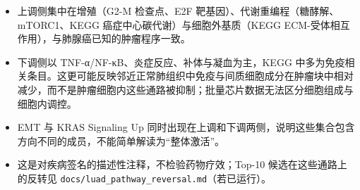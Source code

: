 \documentclass[
  10pt,
]{ctexart}
\providecommand{\tightlist}{%
  \setlength{\itemsep}{0pt}\setlength{\parskip}{0pt}}
\begin{document}
\begin{itemize}
\tightlist
\item
  上调侧集中在增殖（G2-M 检查点、E2F
  靶基因）、代谢重编程（糖酵解、mTORC1、KEGG
  癌症中心碳代谢）与细胞外基质（KEGG
  ECM-受体相互作用），与肺腺癌已知的肿瘤程序一致。
\item
  下调侧以 TNF-α/NF-κB、炎症反应、补体与凝血为主，KEGG
  中多为免疫相关条目。这更可能反映邻近正常肺组织中免疫与间质细胞成分在肿瘤块中相对减少，而不是肿瘤细胞内这些通路被抑制；批量芯片数据无法区分细胞组成与细胞内调控。
\item
  EMT 与 KRAS Signaling Up
  同时出现在上调和下调两侧，说明这些集合包含方向不同的成员，不能简单解读为``整体激活''。
\item
  这是对疾病签名的描述性注释，不检验药物疗效；Top-10
  候选在这些通路上的反转见
  \texttt{docs/\allowbreak{}luad\_\allowbreak{}pathway\_\allowbreak{}reversal.\allowbreak{}md}（若已运行）。
\end{itemize}
\end{document}
